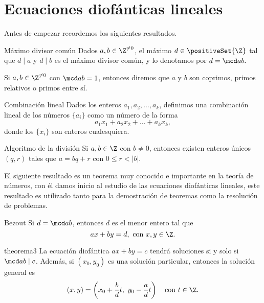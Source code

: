 \section{Ecuaciones diofánticas lineales}

Antes de empezar recordemos los siguientes resultados.

\begin{definition.box}{Máximo divisor común}{}
    Dados $a,b \in \Z^{\neq 0}$, el máximo $d \in \positiveSet{\Z}$ tal que $d \mid a$ y $d \mid b$ es el máximo divisor común,
    y lo denotamos por $d = \mcd a b.$
\end{definition.box}

\begin{definition.box}{}{}
    Si $a,b \in \Z^{\neq 0}$ con $\mcd a b = 1$, entonces diremos que $a$ y $b$ son coprimos, primos relativos o primos entre sí.
\end{definition.box}

\begin{definition.box}{Combinación lineal}{}
    Dados los enteros $a_1, a_2, \ldots, a_k$, definimos una combinación lineal de los números $\{a_i\}$ como un número de la forma
    \[
        a_1 x_1 + a_2 x_2 + \ldots + a_k x_k,
    \]
    donde los $\{x_i\}$ son enteros cualesquiera.
\end{definition.box}

\begin{theorem.box}{Algoritmo de la división}{}
    Si $a, b \in \Z$ con $b \neq 0$, entonces existen enteros únicos $(q,r)$ tales que $a = bq + r$ con $0 \leq r < |b|$.
\end{theorem.box}

El siguiente resultado es un teorema muy conocido e importante en la teoría de números, con él damos inicio al
estudio de las ecuaciones diofánticas lineales, este resultado es utilizado tanto para la demostración de teoremas como
la resolución de problemas.

\begin{theorem.box}{Bezout}{}
    Si $d = \mcd a b$, entonces $d$ es el menor entero tal que
    \[
        ax + by = d,\ \text{con}\ x,y \in \Z.
    \]
\end{theorem.box}

\begin{theorem.box}{}{theorema3}
    La ecuación diofántica $ax + by = c$ tendrá soluciones si y solo si $\mcd a b \mid c$.
    Además, si $(x_0,y_0)$ es una solución particular, entonces la solución general es
    \[
        (x,y) = \left(x_0+\frac{b}{d}t,\ y_0 -\frac{a}{d}t\right) \quad \text{con}\ t \in \Z.
    \]
\end{theorem.box}

